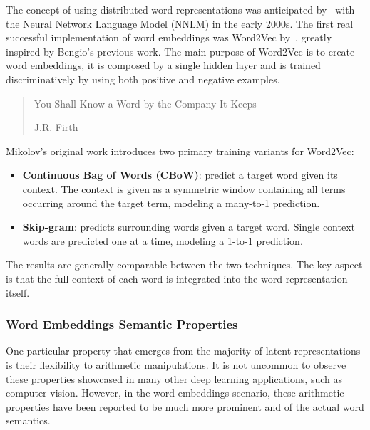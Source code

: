 The concept of using distributed word representations was anticipated by~\citet{bengio2000} with the Neural Network Language Model (NNLM) in the early 2000s.
The first real successful implementation of word embeddings was Word2Vec by~\citet{mikolov2013}, greatly inspired by Bengio's previous work.
The main purpose of Word2Vec is to create word embeddings, it is composed by a single hidden layer and is trained discriminatively by using both positive and negative examples.

\blockquote[J.R. Firth]{You Shall Know a Word by the Company It Keeps}

\begin{figure}[H]
    \centering
    \quad
    \caption{}
    \label{fig:background_word2vec-cbow_word2vec-skipg}
\end{figure}

Mikolov's original work introduces two primary training variants for Word2Vec:
\begin{itemize}
    \item \textbf{Continuous Bag of Words (CBoW)}: predict a target word given its context.
The context is given as a symmetric window containing all terms occurring around the target term, modeling a many-to-1 prediction.
    \item \textbf{Skip-gram}: predicts surrounding words given a target word.
Single context words are predicted one at a time, modeling a 1-to-1 prediction.
\end{itemize}
The results are generally comparable between the two techniques.
The key aspect is that the full context of each word is integrated into the word representation itself.

\subsubsection*{Word Embeddings Semantic Properties}

One particular property that emerges from the majority of latent representations is their flexibility to arithmetic manipulations.
It is not uncommon to observe these properties showcased in many other deep learning applications, such as computer vision.
However, in the word embeddings scenario, these arithmetic properties have been reported to be much more prominent and  of the actual word semantics.

